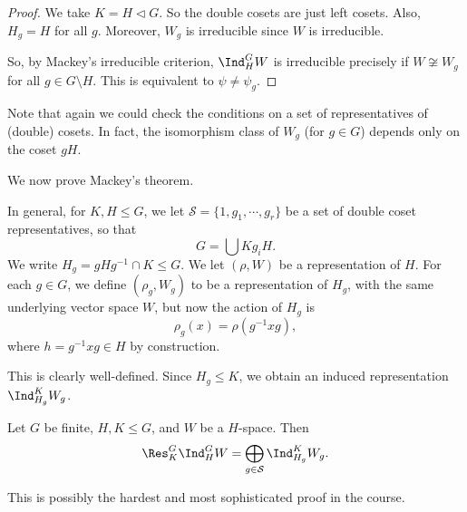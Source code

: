 \documentclass[a4paper]{article}
\begin{document}
\begin{proof}
  We take $K = H \lhd G$. So the double cosets are just left cosets. Also, $H_g = H$ for all $g$. Moreover, $W_g$ is irreducible since $W$ is irreducible.

  So, by Mackey's irreducible criterion, $\Ind_H^G W$ is irreducible precisely if $W \not\cong W_g$ for all $g \in G \setminus H$. This is equivalent to $\psi \not= \psi_g$.
\end{proof}

Note that again we could check the conditions on a set of representatives of (double) cosets. In fact, the isomorphism class of $W_g$ (for $g \in G$) depends only on the coset $gH$.

We now prove Mackey's theorem.
\begin{thm}
  In general, for $K, H \leq G$, we let $\mathcal{S} = \{1, g_1, \cdots, g_r\}$ be a set of double coset representatives, so that
  \[
    G = \bigcup K g_i H.
  \]
  We write $H_g = gHg^{-1} \cap K \leq G$. We let $(\rho, W)$ be a representation of $H$. For each $g \in G$, we define $(\rho_g, W_g)$ to be a representation of $H_g$, with the same underlying vector space $W$, but now the action of $H_g$ is
  \[
    \rho_g(x) = \rho(g^{-1} xg),
  \]
  where $h = g^{-1}xg \in H$ by construction.

  This is clearly well-defined. Since $H_g \leq K$, we obtain an induced representation $\Ind_{H_g}^K W_g$.

  Let $G$ be finite, $H, K \leq G$, and $W$ be a $H$-space. Then
  \[
    \Res_K^G \Ind_H^G W = \bigoplus_{g \in \mathcal{S}} \Ind_{H_g}^K W_g.
  \]
\end{thm}
This is possibly the hardest and most sophisticated proof in the course.
\end{document}
